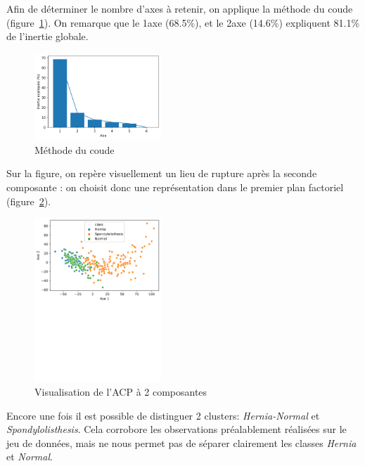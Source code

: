 \documentclass[twocolumn,10pt]{article}
\begin{document}
Afin de déterminer le nombre d'axes à retenir, on applique la méthode du coude (figure~\ref{fig:inertie_expliquee_ACP}).
On remarque que le 1\ier axe (68.5\%), et le 2\ieme axe (14.6\%) expliquent 81.1\% de l'inertie globale.

\begin{figure}[htbp]
    \begin{center}
        \includegraphics[width=0.425\textwidth]{figures/inertie_expliquee_ACP.png}
        \caption{\label{fig:inertie_expliquee_ACP}Méthode du coude}
    \end{center}
\end{figure}

Sur la figure, on repère visuellement un lieu de rupture après la seconde composante : on choisit donc une représentation dans le premier plan factoriel (figure~\ref{fig:ACP}).

\begin{figure}[htbp]
    \begin{center}
        \includegraphics[trim=0 14cm 0 0, width=0.425\textwidth]{figures/ACP.pdf}
        \caption{\label{fig:ACP}Visualisation de l'ACP à 2 composantes}
    \end{center}
\end{figure}

Encore une fois il est possible de distinguer 2 clusters: \textit{Hernia-Normal} et \textit{Spondylolisthesis}. Cela corrobore les observations préalablement réalisées sur le jeu de données, mais ne nous permet pas de séparer clairement les classes \textit{Hernia} et \textit{Normal}.
\end{document}
